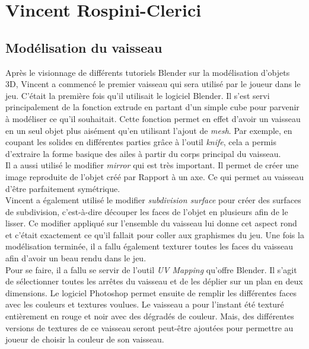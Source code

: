 \documentclass[10pt, titlepage]{report}
\begin{document}
\section{Vincent Rospini-Clerici}

\subsection{Modélisation du vaisseau}

Après le visionnage de différents tutoriels Blender sur la modélisation d'objets 3D, Vincent a commencé le premier vaisseau qui sera utilisé par le joueur dans le jeu. C'était la première fois qu'il utilisait le logiciel Blender. Il s'est servi principalement de la fonction extrude en partant d'un simple cube pour parvenir à modéliser ce qu'il souhaitait. Cette fonction permet en effet d'avoir un vaisseau en un seul objet plus aisément qu'en utilisant l'ajout de \textit{mesh}. Par exemple, en coupant les solides en différentes parties grâce à l'outil \textit{knife}, cela a permis d'extraire la forme basique des ailes à partir du corps principal du vaisseau.\\

Il a aussi utilisé le modifier \textit{mirror} qui est très important. Il permet de créer une image reproduite de l’objet créé par Rapport à un axe. Ce qui permet au vaisseau d'être parfaitement symétrique.\\

Vincent a également utilisé le modifier \textit{subdivision surface} pour créer des surfaces de subdivision, c’est-à-dire découper les faces de l’objet en plusieurs afin de le lisser. Ce modifier appliqué sur l’ensemble du vaisseau lui donne cet aspect rond et c’était exactement ce qu’il fallait pour coller aux graphismes du jeu.
Une fois la modélisation terminée, il a fallu également texturer toutes les faces du vaisseau afin d'avoir un beau rendu dans le jeu.\\

Pour se faire, il a fallu se servir de l'outil \textit{UV Mapping} qu'offre Blender. Il s'agit de sélectionner toutes les arrêtes du vaisseau et de les déplier sur un plan en deux dimensions. Le logiciel Photoshop permet ensuite de remplir les différentes faces avec les couleurs et textures voulues. Le vaisseau a pour l'instant été texturé entièrement en rouge et noir avec des dégradés de couleur. Mais, des différentes versions de textures de ce vaisseau seront peut-être ajoutées pour permettre au joueur de choisir la couleur de son vaisseau.\\
\end{document}
